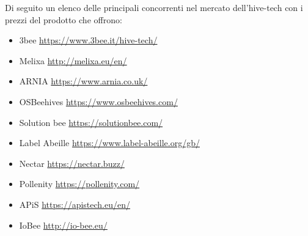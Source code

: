 Di seguito un elenco delle principali concorrenti nel mercato dell’hive-tech con
i prezzi del prodotto che offrono:
\begin{itemize}
\item 3bee          \url{https://www.3bee.it/hive-tech/} 
\item Melixa        \url{http://melixa.eu/en/} 
\item ARNIA         \url{https://www.arnia.co.uk/}  
\item OSBeehives    \url{https://www.osbeehives.com/}    
\item Solution bee  \url{https://solutionbee.com/} 
\item Label Abeille \url{https://www.label-abeille.org/gb/} 
\item Nectar        \url{https://nectar.buzz/}  
\item Pollenity \url{https://pollenity.com/} 
\item APiS \url{https://apistech.eu/en/}
\item IoBee \url{http://io-bee.eu/}
\end{itemize}
